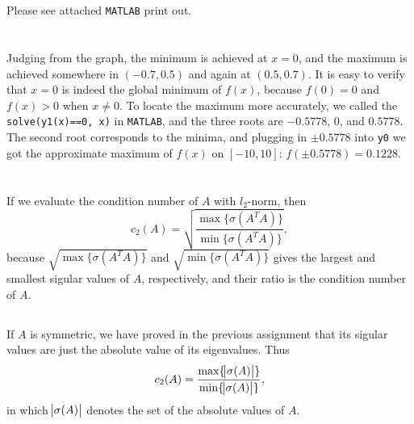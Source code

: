 \documentclass[11pt]{article}
\begin{document}
\maketitle
\section{}
Please see attached \texttt{MATLAB} print out.
\section{}
Judging from the graph, the minimum is achieved at $x=0$, and the maximum is achieved somewhere in $(-0.7, 0.5)$ and again at $(0.5, 0.7)$. It is easy to verify that $x=0$ is indeed the global minimum of $f(x)$, because $f(0) = 0$ and $f(x)>0$ when $x\neq0$. To locate the maximum more accurately, we called the \texttt{solve(y1(x)==0, x)} in \texttt{MATLAB}, and the three roots are $-0.5778$, $0$, and $0.5778$. The second root corresponds to the minima, and plugging in $\pm0.5778$ into \texttt{y0} we got the approximate maximum of $f(x)$ on $[-10, 10]$: $f(\pm0.5778) = 0.1228$.
\section{}
\subsection{}
If we evaluate the condition number of $A$ with $l_2$-norm, then 
$$c_2(A) = \sqrt{\frac{\max\{\sigma(A^TA)\}}{\min\{\sigma(A^TA)\}}},$$
because $\sqrt{\max\{\sigma(A^TA) \}}$ and $\sqrt{\min\{\sigma(A^TA) \}}$ gives the largest and smallest sigular values of $A$, respectively, and their ratio is the condition number of $A$.
\subsection{}
If $A$ is symmetric, we have proved in the previous assignment that its sigular values are just the absolute value of its eigenvalues. Thus 
$$c_2(A) = \frac{\max\{\abs{\sigma(A)} \}}{\min\{\abs{\sigma(A)} \}},$$
in which $\abs{\sigma(A)}$ denotes the set of the absolute values of $A$.
\end{document}
